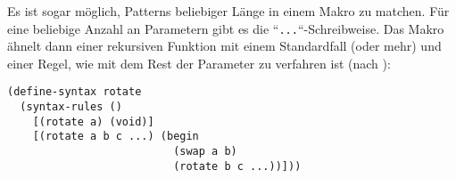 Es ist sogar möglich, Patterns beliebiger Länge in einem Makro zu matchen. Für eine beliebige Anzahl an Parametern gibt es die ``\texttt{...}``-Schreibweise. Das Makro ähnelt dann einer rekursiven Funktion mit einem Standardfall (oder mehr) und einer Regel, wie mit dem Rest der Parameter zu verfahren ist (nach \cite{racketguide-macros}):

\begin{lstlisting}
(define-syntax rotate
  (syntax-rules ()
    [(rotate a) (void)]
    [(rotate a b c ...) (begin
                          (swap a b)
                          (rotate b c ...))]))
\end{lstlisting}


% 
% 

%